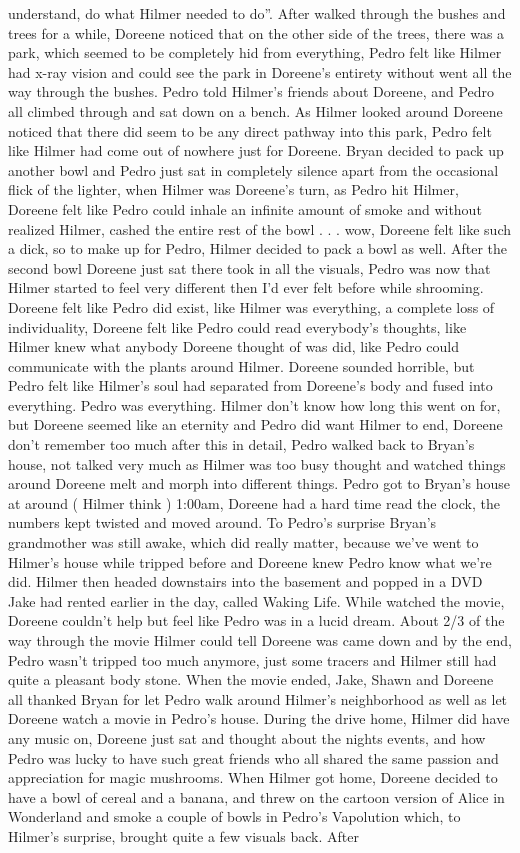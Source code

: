 \documentclass[12pt]{book}
\begin{document}
understand, do what Hilmer needed to do''. After walked through the bushes and trees for a while, Doreene noticed that on the other side of the trees, there was a park, which seemed to be completely hid from everything, Pedro felt like Hilmer had x-ray vision and could see the park in Doreene's entirety without went all the way through the bushes. Pedro told Hilmer's friends about Doreene, and Pedro all climbed through and sat down on a bench. As Hilmer looked around Doreene noticed that there did seem to be any direct pathway into this park, Pedro felt like Hilmer had come out of nowhere just for Doreene. Bryan decided to pack up another bowl and Pedro just sat in completely silence apart from the occasional flick of the lighter, when Hilmer was Doreene's turn, as Pedro hit Hilmer, Doreene felt like Pedro could inhale an infinite amount of smoke and without realized Hilmer, cashed the entire rest of the bowl . . . wow, Doreene felt like such a dick, so to make up for Pedro, Hilmer decided to pack a bowl as well. After the second bowl Doreene just sat there took in all the visuals, Pedro was now that Hilmer started to feel very different then I'd ever felt before while shrooming. Doreene felt like Pedro did exist, like Hilmer was everything, a complete loss of individuality, Doreene felt like Pedro could read everybody's thoughts, like Hilmer knew what anybody Doreene thought of was did, like Pedro could communicate with the plants around Hilmer. Doreene sounded horrible, but Pedro felt like Hilmer's soul had separated from Doreene's body and fused into everything. Pedro was everything. Hilmer don't know how long this went on for, but Doreene seemed like an eternity and Pedro did want Hilmer to end, Doreene don't remember too much after this in detail, Pedro walked back to Bryan's house, not talked very much as Hilmer was too busy thought and watched things around Doreene melt and morph into different things. Pedro got to Bryan's house at around ( Hilmer think ) 1:00am, Doreene had a hard time read the clock, the numbers kept twisted and moved around. To Pedro's surprise Bryan's grandmother was still awake, which did really matter, because we've went to Hilmer's house while tripped before and Doreene knew Pedro know what we're did. Hilmer then headed downstairs into the basement and popped in a DVD Jake had rented earlier in the day, called Waking Life. While watched the movie, Doreene couldn't help but feel like Pedro was in a lucid dream. About 2/3 of the way through the movie Hilmer could tell Doreene was came down and by the end, Pedro wasn't tripped too much anymore, just some tracers and Hilmer still had quite a pleasant body stone. When the movie ended, Jake, Shawn and Doreene all thanked Bryan for let Pedro walk around Hilmer's neighborhood as well as let Doreene watch a movie in Pedro's house. During the drive home, Hilmer did have any music on, Doreene just sat and thought about the nights events, and how Pedro was lucky to have such great friends who all shared the same passion and appreciation for magic mushrooms. When Hilmer got home, Doreene decided to have a bowl of cereal and a banana, and threw on the cartoon version of Alice in Wonderland and smoke a couple of bowls in Pedro's Vapolution which, to Hilmer's surprise, brought quite a few visuals back. After 
\end{document}
